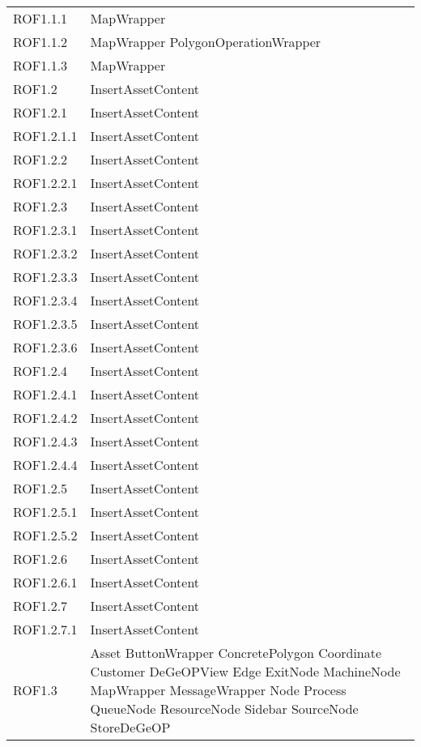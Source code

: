 \begin{longtable}{p{2.5cm}!{\VRule[1pt]}p{5cm}}
	ROF1.1.1 & MapWrapper\\
	ROF1.1.2 & MapWrapper \newline PolygonOperationWrapper\\
	ROF1.1.3 & MapWrapper\\
	ROF1.2 & InsertAssetContent\\
	ROF1.2.1 & InsertAssetContent\\
	ROF1.2.1.1 & InsertAssetContent\\
	ROF1.2.2 & InsertAssetContent\\
	ROF1.2.2.1 & InsertAssetContent\\
	ROF1.2.3 & InsertAssetContent\\
	ROF1.2.3.1 & InsertAssetContent\\
	ROF1.2.3.2 & InsertAssetContent\\
	ROF1.2.3.3 & InsertAssetContent\\
	ROF1.2.3.4 & InsertAssetContent\\
	ROF1.2.3.5 & InsertAssetContent\\
	ROF1.2.3.6 & InsertAssetContent\\
	ROF1.2.4 & InsertAssetContent\\
	ROF1.2.4.1 & InsertAssetContent\\
	ROF1.2.4.2 & InsertAssetContent\\
	ROF1.2.4.3 & InsertAssetContent\\
	ROF1.2.4.4 & InsertAssetContent\\
	ROF1.2.5 & InsertAssetContent\\
	ROF1.2.5.1 & InsertAssetContent\\
	ROF1.2.5.2 & InsertAssetContent\\
	ROF1.2.6 & InsertAssetContent\\
	ROF1.2.6.1 & InsertAssetContent\\
	ROF1.2.7 & InsertAssetContent\\
	ROF1.2.7.1 & InsertAssetContent\\
	ROF1.3 & Asset \newline ButtonWrapper \newline ConcretePolygon \newline Coordinate \newline Customer \newline DeGeOPView \newline Edge \newline ExitNode \newline MachineNode \newline MapWrapper \newline MessageWrapper \newline Node \newline Process \newline QueueNode \newline ResourceNode \newline Sidebar \newline SourceNode \newline StoreDeGeOP\\

\end{longtable}
